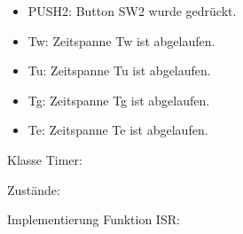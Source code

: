 \begin{itemize}
	\item PUSH2: Button SW2 wurde gedrückt.
	\item Tw: Zeitspanne Tw ist abgelaufen.
	\item Tu: Zeitspanne Tu ist abgelaufen.
	\item Tg: Zeitspanne Tg ist abgelaufen.
	\item Te: Zeitspanne Te ist abgelaufen.
\end{itemize}
\noindent Klasse Timer:

\noindent Zustände:

\noindent Implementierung Funktion ISR:
